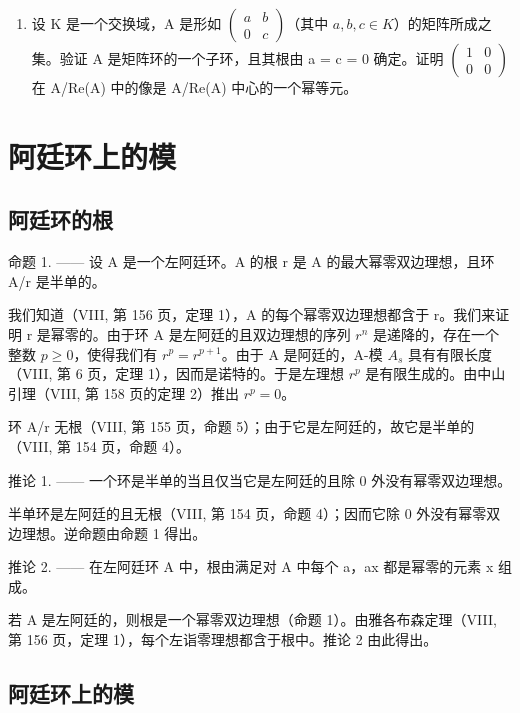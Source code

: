 \begin{enumerate}
\def\labelenumi{\arabic{enumi})}
\setcounter{enumi}{30}
\tightlist
\item
  设 K 是一个交换域，A 是形如 \(\begin{pmatrix} a & b \\ 0 & c \end{pmatrix}\)（其中 \(a, b, c \in K\)）的矩阵所成之集。验证 A 是矩阵环的一个子环，且其根由 a = c = 0 确定。证明 \(\begin{pmatrix} 1 & 0 \\ 0 & 0 \end{pmatrix}\) 在 A/Re(A) 中的像是 A/Re(A) 中心的一个幂等元。
\end{enumerate}

\section{阿廷环上的模}

\subsection{阿廷环的根}

命题 1. —— 设 A 是一个左阿廷环。A 的根 r 是 A 的最大幂零双边理想，且环 A/r 是半单的。

我们知道（VIII, 第 156 页，定理 1），A 的每个幂零双边理想都含于 r。我们来证明 r 是幂零的。由于环 A 是左阿廷的且双边理想的序列 \(r^{n}\) 是递降的，存在一个整数 \(p \geqslant 0\)，使得我们有 \(r^{p} = r^{p+1}\)。由于 A 是阿廷的，A-模 \(A_{s}\) 具有有限长度（VIII, 第 6 页，定理 1），因而是诺特的。于是左理想 \(r^{p}\) 是有限生成的。由中山引理（VIII, 第 158 页的定理 2）推出 \(r^{p} = 0\)。

环 A/r 无根（VIII, 第 155 页，命题 5）；由于它是左阿廷的，故它是半单的（VIII, 第 154 页，命题 4）。

推论 1. —— 一个环是半单的当且仅当它是左阿廷的且除 0 外没有幂零双边理想。

半单环是左阿廷的且无根（VIII, 第 154 页，命题 4）；因而它除 0 外没有幂零双边理想。逆命题由命题 1 得出。

推论 2. —— 在左阿廷环 A 中，根由满足对 A 中每个 a，ax 都是幂零的元素 x 组成。

若 A 是左阿廷的，则根是一个幂零双边理想（命题 1）。由雅各布森定理（VIII, 第 156 页，定理 1），每个左诣零理想都含于根中。推论 2 由此得出。

\subsection{阿廷环上的模}

